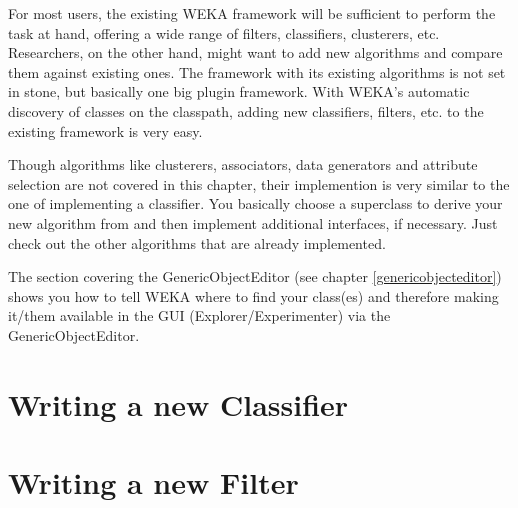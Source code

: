 %
%
%
%


For most users, the existing WEKA framework will be sufficient to perform the
task at hand, offering a wide range of filters, classifiers, clusterers, etc.
Researchers, on the other hand, might want to add new algorithms and compare
them against existing ones. The framework with its existing algorithms is not
set in stone, but basically one big plugin framework. With WEKA's automatic
discovery of classes on the classpath, adding new classifiers, filters, etc. to
the existing framework is very easy.

Though algorithms like clusterers, associators, data generators and
attribute selection are not covered in this chapter, their implemention is very
similar to the one of implementing a classifier. You basically choose a
superclass to derive your new algorithm from and then implement additional
interfaces, if necessary. Just check out the other algorithms that are already
implemented.

The section covering the GenericObjectEditor (see chapter
\ref{genericobjecteditor}) shows you how to tell WEKA where to find your
class(es) and therefore making it/them available in the GUI
(Explorer/Experimenter) via the GenericObjectEditor.


\clearpage
\section{Writing a new Classifier}



\newpage
\section{Writing a new Filter}


